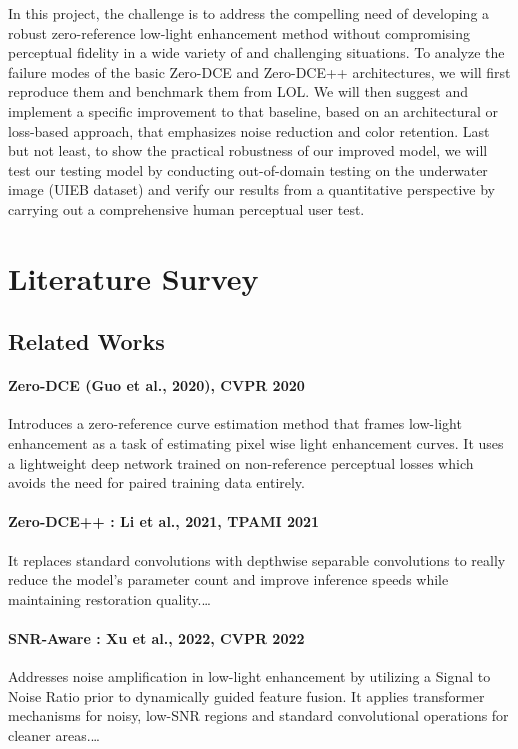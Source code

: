 \documentclass[11pt, letterpaper]{article}
\begin{document}
In this project, the challenge is to address the compelling need of developing a robust zero-reference low-light enhancement method without compromising perceptual fidelity in a wide variety of and challenging situations. To analyze the failure modes of the basic Zero-DCE and Zero-DCE++ architectures, we will first reproduce them and benchmark them from LOL. We will then suggest and implement a specific improvement to that baseline, based on an architectural or loss-based approach, that emphasizes noise reduction and color retention. Last but not least, to show the practical robustness of our improved model, we will test our testing model by conducting out-of-domain testing on the underwater image (UIEB dataset) and verify our results from a quantitative perspective by carrying out a comprehensive human perceptual user test.

\section{Literature Survey}

\subsection{Related Works}

\paragraph{Zero-DCE (Guo et al., 2020), CVPR 2020}
 Introduces a zero-reference curve estimation method that frames low-light enhancement as a task of estimating pixel wise light enhancement curves. It uses a lightweight deep network trained on non-reference perceptual losses which avoids the need for paired training data entirely.

\paragraph{Zero-DCE++ : Li et al., 2021, TPAMI 2021}
It replaces standard convolutions with depthwise separable convolutions to really reduce the model's parameter count and improve inference speeds while maintaining restoration quality.\ldots

\paragraph{SNR-Aware : Xu et al., 2022, CVPR 2022}
Addresses noise amplification in low-light enhancement by utilizing a Signal to Noise Ratio prior to dynamically guided feature fusion. It applies transformer mechanisms for noisy, low-SNR regions and standard convolutional operations for cleaner areas.\ldots
\end{document}

